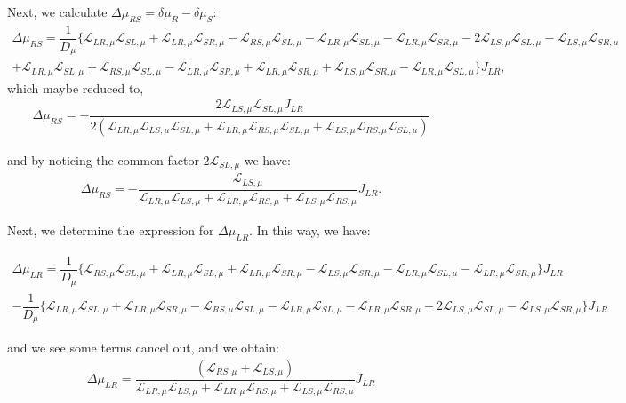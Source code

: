 \begin{widetext}
Next, we calculate $\Delta\mu_{RS}=\delta\mu_{R}-\delta\mu_{S}$:
\begin{multline*}
\Delta\mu_{RS}=
\dfrac{1}{D_{\mu}}\{
\mathcal{L}_{LR,\mu}\mathcal{L}_{SL,\mu}
+\mathcal{L}_{LR,\mu}\mathcal{L}_{SR,\mu}
-\mathcal{L}_{RS,\mu} \mathcal{L}_{SL,\mu}
-\mathcal{L}_{LR,\mu}\mathcal{L}_{SL,\mu}
-\mathcal{L}_{LR,\mu}\mathcal{L}_{SR,\mu}
- 2\mathcal{L}_{LS,\mu}\mathcal{L}_{SL,\mu}
-\mathcal{L}_{LS,\mu}\mathcal{L}_{SR,\mu}
\\+
\mathcal{L}_{LR,\mu}\mathcal{L}_{SL,\mu}
+\mathcal{L}_{RS,\mu}\mathcal{L}_{SL,\mu}
-\mathcal{L}_{LR,\mu} \mathcal{L}_{SR,\mu}
+\mathcal{L}_{LR,\mu}\mathcal{L}_{SR,\mu}
+\mathcal{L}_{LS,\mu}\mathcal{L}_{SR,\mu}
-\mathcal{L}_{LR,\mu} \mathcal{L}_{SL,\mu}\}J_{LR},    
\end{multline*}
which maybe reduced to,
\begin{align*}
\Delta\mu_{RS}=
-\dfrac{2\mathcal{L}_{LS,\mu}\mathcal{L}_{SL,\mu}J_{LR}}{
2(\mathcal{L}_{LR,\mu} \mathcal{L}_{LS,\mu} \mathcal{L}_{SL,\mu}
+\mathcal{L}_{LR,\mu} \mathcal{L}_{RS,\mu} \mathcal{L}_{SL,\mu}
+\mathcal{L}_{LS,\mu} \mathcal{L}_{RS,\mu} \mathcal{L}_{SL,\mu})}  
\end{align*}
\end{widetext}
and by noticing the common factor $2\mathcal{L}_{SL,\mu}$ we have:
\begin{align}\label{Delta:muRS}
\Delta\mu_{RS}=
-\dfrac{\mathcal{L}_{LS,\mu}}{
\mathcal{L}_{LR,\mu} \mathcal{L}_{LS,\mu} 
+\mathcal{L}_{LR,\mu} \mathcal{L}_{RS,\mu} 
+\mathcal{L}_{LS,\mu} \mathcal{L}_{RS,\mu} } J_{LR}.
\end{align} 

Next, we determine the expression for $\Delta\mu_{LR}$. In this way, we have:
\begin{widetext}
\begin{align*}
\Delta\mu_{LR}
=
\dfrac{1}{D_{\mu}}\{
\mathcal{L}_{RS,\mu} \mathcal{L}_{SL,\mu}+\mathcal{L}_{LR,\mu}\mathcal{L}_{SL,\mu}+\mathcal{L}_{LR,\mu}\mathcal{L}_{SR,\mu}
-
\mathcal{L}_{LS,\mu}\mathcal{L}_{SR,\mu}-\mathcal{L}_{LR,\mu}\mathcal{L}_{SL,\mu}-\mathcal{L}_{LR,\mu}\mathcal{L}_{SR,\mu}\}J_{LR}
\\
-\dfrac{1}{D_{\mu}}\{
\mathcal{L}_{LR,\mu}\mathcal{L}_{SL,\mu}+\mathcal{L}_{LR,\mu}\mathcal{L}_{SR,\mu}-\mathcal{L}_{RS,\mu} \mathcal{L}_{SL,\mu}
-
\mathcal{L}_{LR,\mu}\mathcal{L}_{SL,\mu}
-\mathcal{L}_{LR,\mu}\mathcal{L}_{SR,\mu}
- 2\mathcal{L}_{LS,\mu}\mathcal{L}_{SL,\mu}
-\mathcal{L}_{LS,\mu}\mathcal{L}_{SR,\mu}\}J_{LR}
\end{align*}
\end{widetext}
and we see some terms cancel out, and we obtain:
\begin{align}\label{Delta:muLR}
\Delta\mu_{LR}
=
\dfrac{(\mathcal{L}_{RS,\mu}+\mathcal{L}_{LS,\mu})}{\mathcal{L}_{LR,\mu} \mathcal{L}_{LS,\mu} +\mathcal{L}_{LR,\mu} \mathcal{L}_{RS,\mu} +\mathcal{L}_{LS,\mu} \mathcal{L}_{RS,\mu}}J_{LR}
\end{align}


